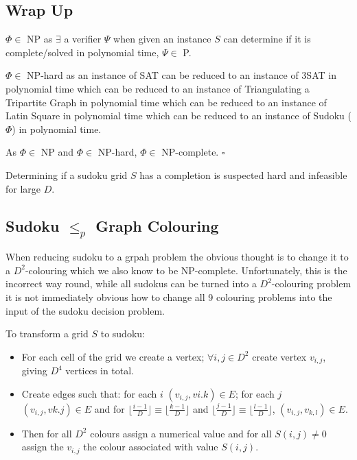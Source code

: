 \documentclass[a4paper,11pt]{report}
\newcounter{col}
\begin{document}

\subsection{Wrap Up} 

$\Phi\in $ NP as $\exists$ a verifier $\Psi$ when given an instance $S$ can determine if it is complete/solved in polynomial time, $\Psi\in$ P.

$\Phi\in $ NP-hard as an instance of SAT can be reduced to an instance of 3SAT in polynomial time which can be reduced to an instance of Triangulating a Tripartite Graph in polynomial time which can be reduced to an instance of Latin Square in polynomial time which can be reduced to an instance of Sudoku ($\Phi$) in polynomial time.

As $\Phi\in$ NP and $\Phi\in$ NP-hard, $\Phi\in$ NP-complete. $\square$

Determining if a sudoku grid $S$ has a completion is suspected hard and infeasible for large $D$.

\subsection{Sudoku $\leq_p$  Graph Colouring}

When reducing sudoku to a grpah problem the obvious thought is to change it to a $D^2$-colouring which we also know to be NP-complete. Unfortunately, this is the incorrect way round, while all sudokus can be turned into a $D^2$-colouring problem it is not immediately obvious how to change all 9 colouring problems into the input of the sudoku decision problem. 

To transform a grid $S$ to sudoku:
\begin{itemize}
\item For each cell of the grid we create a vertex; $\forall i,j\in D^2$ create vertex $v_{i,j}$, giving $D^4$ vertices in total.
\item Create edges such that: for each $i$ $(v_{i,j},v{i.k})\in E$; for each $j$ $(v_{i,j},v{k.j})\in E$ and for $\lfloor\frac{i-1}{D}\rfloor\equiv\lfloor\frac{k-1}{D}\rfloor$ and $\lfloor\frac{j-1}{D}\rfloor\equiv\lfloor\frac{l-1}{D}\rfloor$, $(v_{i,j},v_{k,l})\in E$.
\item Then for all $D^2$ colours assign a numerical value and for all $S(i,j)\neq 0$ assign the $v_{i,j}$ the colour associated with value $S(i,j)$.
\end{itemize}
\end{document}
